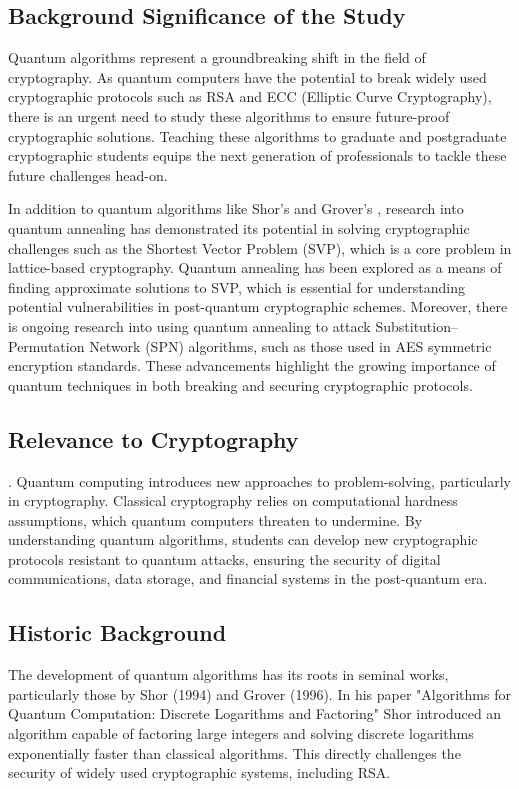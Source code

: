 \documentclass[11pt,a4paper]{article}
\begin{document}
\subsection{Background Significance of the Study}

Quantum algorithms represent a groundbreaking shift in the field of cryptography.
As quantum computers have the potential to break widely used cryptographic protocols such as RSA and ECC (Elliptic Curve Cryptography), there is an urgent need to study these algorithms to ensure future-proof cryptographic solutions.
Teaching these algorithms to graduate and postgraduate cryptographic students equips the next generation of professionals to tackle these future challenges head-on.

In addition to quantum algorithms like Shor’s \cite{Shor:1994} and Grover’s \cite{Grover:1996}, research into quantum annealing has demonstrated its potential in solving cryptographic challenges such as the Shortest Vector Problem (SVP), which is a core problem in lattice-based cryptography.
Quantum annealing has been explored as a means of finding approximate solutions to SVP, which is essential for understanding potential vulnerabilities in post-quantum cryptographic schemes.
Moreover, there is ongoing research into using quantum annealing to attack Substitution–Permutation Network (SPN) algorithms, such as those used in AES symmetric encryption standards.
These advancements highlight the growing importance of quantum techniques in both breaking and securing cryptographic protocols.

\subsection{Relevance to Cryptography}

. 
Quantum computing introduces new approaches to problem-solving, particularly in cryptography.
Classical cryptography relies on computational hardness assumptions, which quantum computers threaten to undermine.
By understanding quantum algorithms, students can develop new cryptographic protocols resistant to quantum attacks, ensuring the security of digital communications, data storage, and financial systems in the post-quantum era.

\subsection{Historic Background}

The development of quantum algorithms has its roots in seminal works, particularly those by Shor (1994) and Grover (1996).
In his paper  "Algorithms for Quantum Computation: Discrete Logarithms and Factoring" Shor introduced an algorithm capable of factoring large integers and solving discrete logarithms exponentially faster than classical algorithms.
This directly challenges the security of widely used cryptographic systems, including RSA.
\end{document}
